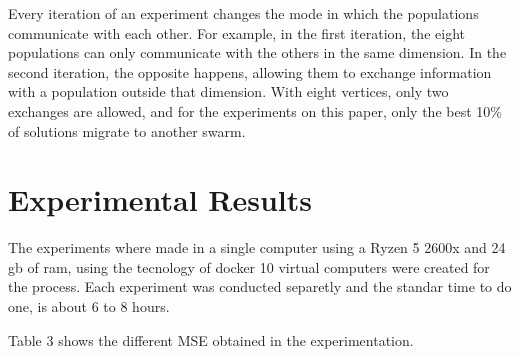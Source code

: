 \documentclass[runningheads]{llncs}
\begin{document}
Every iteration of an experiment changes the mode in which the
populations communicate with each other. For example, in the first
iteration, the eight populations can only communicate with the others
in the same dimension. In the second iteration, the opposite happens,
allowing them to exchange information with a population outside that
dimension.   With eight vertices, only two exchanges are allowed, and
for the experiments on this paper, only the best 10\% of solutions
migrate to another swarm.

\section{Experimental Results}

The experiments where made in a single computer using a Ryzen 5 2600x and 24 gb of ram, using the tecnology of docker 10 virtual computers were created for the process. Each experiment was conducted separetly and the standar time to do one, is about 6 to 8 hours.

Table 3 shows the different MSE obtained in the experimentation. %
\end{document}
